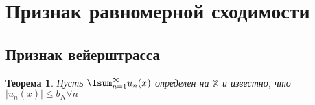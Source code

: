 \documentclass[12pt, oneside]{article}
\theoremstyle{plain}
\newtheorem{Theorem}{Теорема}
\begin{document}
	\section{Признак равномерной сходимости}
	\subsection{Признак вейерштрасса}
	\begin{Theorem}
		Пусть \(\lsum_{n=1}^{\infty} u_n(x)\) определен на \(\mathbb{X}\) и известно,
		что \(|u_n(x)| \leq b_N \forall n\)
	\end{Theorem}
\end{document}
